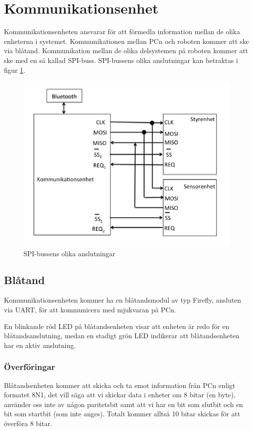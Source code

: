 \section{Kommunikationsenhet}
Kommunikationsenheten ansvarar för att förmedla information mellan de olika enheterna i systemet. 
Kommunikationen mellan PCn och roboten kommer att ske via blåtand. Kommunikation mellan de olika delsystemen på roboten kommer att ske med en så kallad SPI-buss. SPI-bussens olika anslutningar kan betraktas i figur \ref{fig:spibuss}.

\begin{figure}[H]
  
 \includegraphics[angle=0,scale=0.5]{bilder/SPI-buss.png}
  \caption{SPI-bussens olika anslutningar}
  \label{fig:spibuss}
\end{figure}


\subsection{Blåtand}
Kommunikationsenheten kommer ha en blåtandsmodul av typ Firefly, ansluten via
UART, för att kommunicera med mjukvaran på PCn.

En blinkande röd LED på blåtandsenheten visar att enheten är redo för en
blåtandsanslutning, medan en stadigt grön LED indikerar att blåtandsenheten har
en aktiv anslutning.

\subsubsection{Överföringar}
Blåtandsenheten kommer att skicka och ta emot information från PCn enligt formatet
8N1, det vill säga att vi skickar data i enheter om 8 bitar (en byte), använder oss
inte av någon paritetsbit samt att vi har en bit som slutbit och en bit som startbit
(som inte anges). Totalt kommer alltså 10 bitar skickas för att överföra 8
bitar. 

